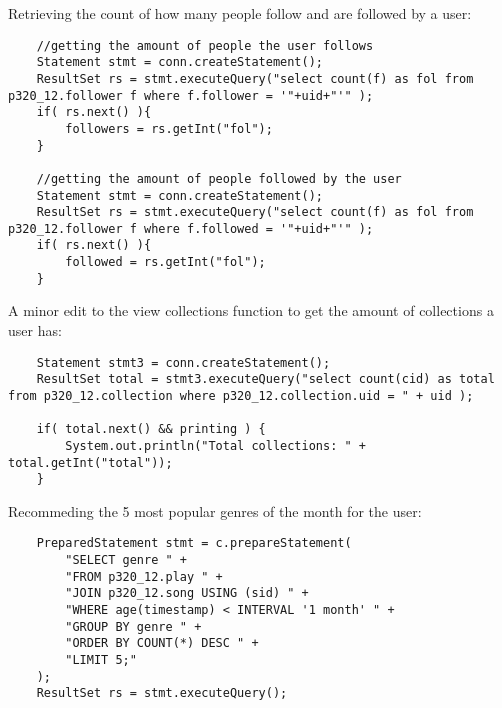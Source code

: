 \documentclass[12pt]{article}
\begin{document}
    Retrieving the count of how many people follow and are followed by a user:
    
    \begin{lstlisting}
    //getting the amount of people the user follows
    Statement stmt = conn.createStatement();
    ResultSet rs = stmt.executeQuery("select count(f) as fol from p320_12.follower f where f.follower = '"+uid+"'" );
    if( rs.next() ){
        followers = rs.getInt("fol");
    }
    
    //getting the amount of people followed by the user
    Statement stmt = conn.createStatement();
    ResultSet rs = stmt.executeQuery("select count(f) as fol from p320_12.follower f where f.followed = '"+uid+"'" );
    if( rs.next() ){
        followed = rs.getInt("fol");
    }
    \end{lstlisting}
    
    A minor edit to the view collections function to get the amount of collections a user has:
    
    \begin{lstlisting}
    Statement stmt3 = conn.createStatement();
    ResultSet total = stmt3.executeQuery("select count(cid) as total from p320_12.collection where p320_12.collection.uid = " + uid );

    if( total.next() && printing ) {
        System.out.println("Total collections: " + total.getInt("total"));
    }
    \end{lstlisting}
    
    Recommeding the 5 most popular genres of the month for the user:
    
    \begin{lstlisting}
    PreparedStatement stmt = c.prepareStatement(
        "SELECT genre " +
        "FROM p320_12.play " +
        "JOIN p320_12.song USING (sid) " +
        "WHERE age(timestamp) < INTERVAL '1 month' " +
        "GROUP BY genre " +
        "ORDER BY COUNT(*) DESC " +
        "LIMIT 5;"
    );
    ResultSet rs = stmt.executeQuery();
    \end{lstlisting}
    
    
    
\end{document}
